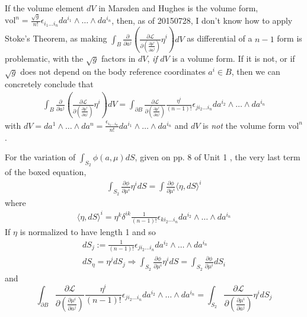 \documentclass[twoside,landscape,10pt]{amsart}
\theoremstyle{plain}
\theoremstyle{definition}
\theoremstyle{remark}
\begin{document}
\begin{multicols*}{2}
If the volume element $dV$ in Marsden and Hughes \cite{JMarsdenTHughes1994} is the volume form, $\text{vol}^n = \frac{\sqrt{g}}{n!} \epsilon_{i_1\dots i_n} da^{i_1} \wedge \dots \wedge da^{i_n}$, then, as of 20150728, I don't know how to apply Stoke's Theorem, as making $\int_B \frac{ \partial }{ \partial a^j} \left( \frac{ \partial \mathcal{L}}{ \partial \left( \frac{ \partial \mu^i}{ \partial a^j} \right) } \eta^i \right) dV$ as differential of a $n-1$ form is problematic, with the $\sqrt{g}$ factors in $dV$, \emph{if} $dV$ is a volume form.  If it is not, or if $\sqrt{g}$ does not depend on the body reference coordinates $a^i \in B$, then we can concretely conclude that 
\[
\begin{gathered}
\int_B \frac{ \partial }{ \partial a^j} \left( \frac{ \partial \mathcal{L}}{ \partial \left( \frac{ \partial \mu^i}{ \partial a^j} \right) }   \eta^i \right) dV = \int_{\partial B} \frac{ \partial \mathcal{L}}{ \partial \left( \frac{ \partial \mu^i}{ \partial a^j} \right) } \frac{ \eta^i}{ (n-1)!} \epsilon_{ji_2 \dots i_n} da^{i_2} \wedge \dots \wedge da^{i_n}
\end{gathered}
\]
with $dV = da^1 \wedge \dots \wedge da^n = \frac{ \epsilon_{i_1 \dots i_n} }{n!} da^{i_1} \wedge \dots \wedge da^{i_n}$ and $dV$ is \emph{not} the volume form $\text{vol}^n$.  

For the variation of $\int_{S_2} \phi(a, \mu) dS$, given on pp. 8 of Unit 1 \cite{RRadovitzky2003}, the very last term of the boxed equation, 
\[
\begin{gathered}
  \int_{S_2} \frac{ \partial \phi}{ \partial \mu^i} \eta^i dS = \int \frac{ \partial \phi}{ \partial \mu^i} \langle \eta , dS\rangle^i
\end{gathered}
\]
where
\[
\begin{gathered}
  \langle \eta , dS \rangle^i = \eta^k \delta^{ik} \frac{1}{(n-1)!}\epsilon_{ki_2\dots i_n} da^{i_2} \wedge \dots \wedge da^{i_n}
\end{gathered}
\]
If $\eta$ is normalized to have length 1 and so 
\[
\begin{gathered}
dS_j := \frac{1}{(n-1)!} \epsilon_{ji_2\dots i_n} da^{i_2} \wedge \dots \wedge da^{i_n}  \\
dS_{\eta} = \eta^j dS_j \Longrightarrow \int_{S_2} \frac{ \partial \phi}{ \partial \mu^i} \eta^i dS = \int_{S_2} \frac{ \partial \phi}{ \partial \mu^i } dS_i
\end{gathered}
\]
and 
\[
\int_{\partial B} \frac{ \partial \mathcal{L}}{ \partial \left( \frac{ \partial \mu^i}{ \partial a^j} \right) } \frac{ \eta^i}{ (n-1)!} \epsilon_{ji_2 \dots i_n} da^{i_2} \wedge \dots \wedge da^{i_n} = \int_{S_2} \frac{ \partial \mathcal{L}}{ \partial \left( \frac{ \partial \mu^i}{ \partial a^j} \right) } \eta^idS_j
\]


\end{multicols*}
\end{document}
